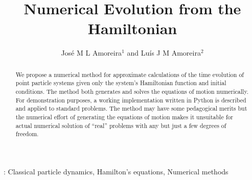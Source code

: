 \documentclass{iopart}
\begin{document}
\title{Numerical Evolution from the Hamiltonian}
\author{José M L Amoreira$^1$ and Luís J M Amoreira$^2$}
\address{$^1$ Departamento de Física, Instituto Superior Técnico, Lisboa,
Portugal}
\address{$^2$ Departamento de Física, Universidade da Beira Interior, Covilhã,
Portugal}
\begin{abstract}
  We propose a numerical method for approximate calculations of the time
  evolution of point particle systems given only the system's Hamiltonian
  function and initial conditions. The method both generates and solves the
  equations of motion numerically. For demonstration purposes, a working
  im\-ple\-men\-ta\-tion written in Python is described and applied
  to standard problems. The method may have some pedagogical merits but the
  numerical effort of generating the equations of motion makes it unsuitable for
  actual numerical solution of ``real'' problems with any but just a few degrees
  of freedom.
\end{abstract}
: Classical particle dynamics,
Hamilton's equations,
Numerical methods

\submitto{\EJP}
\end{document}
